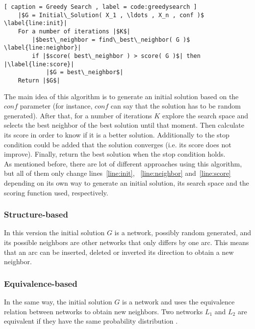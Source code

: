 \begin{lstlisting}[ caption = Greedy Search , label = code:greedysearch ]
	|$G = Initial\_Solution( X_1 , \ldots , X_n , conf )$ \label{line:init}|
	For a number of iterations |$K$|
		|$best\_neighbor = find\_best\_neighbor( G )$ \label{line:neighbor}|
		if |$score( best\_neighbor ) > score( G )$| then |\label{line:score}|
			|$G = best\_neighbor$|
	Return |$G$|
\end{lstlisting}
The main idea of this algorithm is to generate an initial solution based on the ${conf}$ parameter (for instance, ${conf}$ can say that the solution has to be random generated). After that, for a number of iterations $K$ explore the search space and selects the best neighbor of the best solution until that moment. Then calculate its score in order to know if it is a better solution. Additionally to the stop condition could be added that the solution converges (i.e. its score does not improve). Finally, return the best solution when the stop condition holds.\\
As mentioned before, there are lot of different approaches using this algorithm, but all of them only change lines~\ref{line:init}, ~\ref{line:neighbor} and~\ref{line:score} depending on its own way to generate an initial solution, its search space and the scoring function used, respectively.\\
\subsubsection{Structure-based}
\label{subsub:structurebased}
In this version the initial solution $G$ is a network, possibly random generated, and its possible neighbors are other networks that only differs by one arc. This means that an arc can be inserted, deleted or inverted its direction to obtain a new neighbor.\\
\subsubsection{Equivalence-based}
\label{subsub:equivalencebased}
In the same way, the initial solution $G$ is a network and uses the equivalence relation between networks to obtain new neighbors. Two networks $L_1$ and $L_2$ are equivalent if they have the same probability distribution \cite{Maxwell04}.

